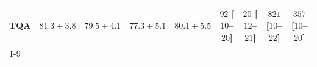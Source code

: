 \begin{tabular}{l|cccc|cccc|}
TQA & {\cellcolor[HTML]{0F76B3}} \color[HTML]{F1F1F1} $81.3\pm 3.8$ & {\cellcolor[HTML]{2182B9}} \color[HTML]{F1F1F1} $79.5\pm 4.1$ & {\cellcolor[HTML]{3991C1}} \color[HTML]{F1F1F1} $77.3\pm 5.1$ & {\cellcolor[HTML]{1B7EB7}} \color[HTML]{F1F1F1} $80.1\pm 5.5$ & {\cellcolor[HTML]{FDE4E1}} \color[HTML]{000000} $92$ [$10$--$20$] & {\cellcolor[HTML]{FFF4F0}} \color[HTML]{000000} $20$ [$12$--$21$] & {\cellcolor[HTML]{4B006A}} \color[HTML]{F1F1F1} $821$ [$10$--$22$] & {\cellcolor[HTML]{F988AD}} \color[HTML]{F1F1F1} $357$ [$10$--$20$] \\
\cline{1-9}
\bottomrule
\end{tabular}
